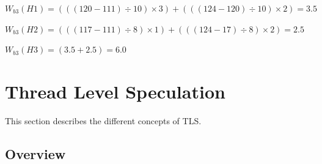 \documentclass[10pt]{report}          %
\begin{document}
\begin{center}
$W_{b3}(H1) = (((120-111)\div 10)\times 3) + (((124-120)\div 10)\times 2)  = 3.5 $ \\
\end{center}
\begin{center}
$W_{b3}(H2) = (((117-111)\div 8)\times 1) + (((124-17)\div 8)\times 2)  = 2.5 $ \\
\end{center}
\begin{center}
$W_{b3}(H3) = (3.5 + 2.5) = 6.0$
\end{center}
  
\section{Thread Level Speculation}

This section describes the different concepts of TLS.
\label{sec:tls}

\subsection{Overview}
 
\end{document}
